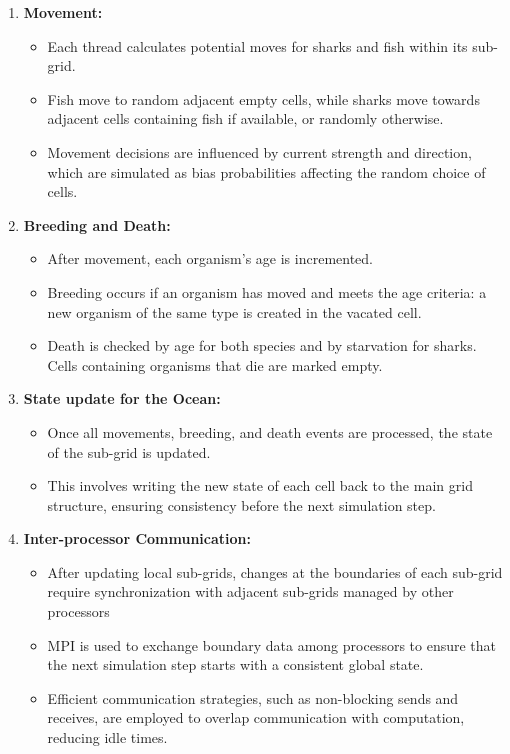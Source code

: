 \documentclass[conference,compsoc]{IEEEtran}
\begin{document}
\begin{enumerate}
\item \textbf{Movement:} 
    \begin{itemize}
        \item Each thread calculates potential moves for sharks and fish within its sub-grid.
        \item Fish move to random adjacent empty cells, while sharks move towards adjacent cells containing fish if available, or randomly otherwise.
        \item Movement decisions are influenced by current strength and direction, which are simulated as bias probabilities affecting the random choice of cells.
    \end{itemize}
\item \textbf{Breeding and Death:}
    \begin{itemize}
        \item After movement, each organism's age is incremented.
        \item Breeding occurs if an organism has moved and meets the age criteria: a new organism of the same type is created in the vacated cell.
        \item Death is checked by age for both species and by starvation for sharks. Cells containing organisms that die are marked empty.
    \end{itemize}
\item \textbf{State update for the Ocean:}
    \begin{itemize}
        \item Once all movements, breeding, and death events are processed, the state of the sub-grid is updated.
        \item This involves writing the new state of each cell back to the main grid structure, ensuring consistency before the next simulation step.
    \end{itemize}
\item \textbf{Inter-processor Communication:}
    \begin{itemize}
        \item After updating local sub-grids, changes at the boundaries of each sub-grid require synchronization with adjacent sub-grids managed by other processors
        \item MPI is used to exchange boundary data among processors to ensure that the next simulation step starts with a consistent global state.
        \item Efficient communication strategies, such as non-blocking sends and receives, are employed to overlap communication with computation, reducing idle times.
    \end{itemize}
\end{enumerate}
\end{document}
